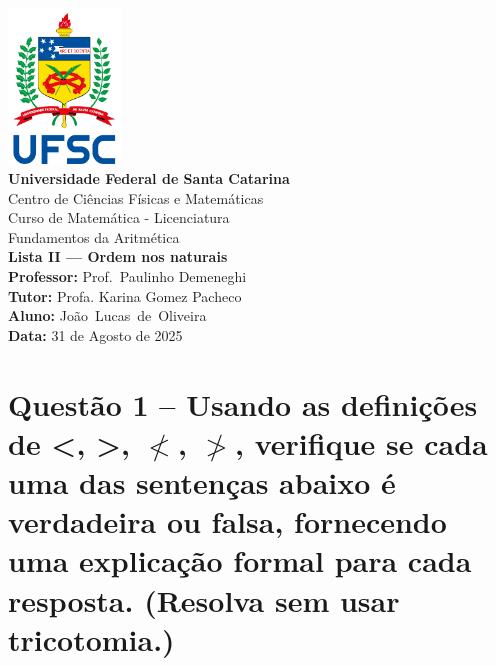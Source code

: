 \documentclass[12pt,a4paper]{article}
\newcommand{\universidade}{Universidade Federal de Santa Catarina}
\newcommand{\centro}{Centro de Ciências Físicas e Matemáticas}
\newcommand{\curso}{Curso de Matemática - Licenciatura}
\newcommand{\disciplina}{Fundamentos da Aritmética}
\newcommand{\professor}{Prof.\ Paulinho Demeneghi}
\newcommand{\tutora}{Profa. Karina Gomez Pacheco}
\newcommand{\autor}{João\ Lucas\ de\ Oliveira}
\newcommand{\dataentrega}{31 de Agosto de 2025}
\begin{document}
\begin{center}
    \includegraphics[width=3cm]{ufsc_logo}\\[0.3cm]
    \textbf{\universidade}\\
    \centro\\
    \curso\\[1cm]
    \disciplina\\
    \textbf{Lista II — Ordem nos naturais}\\[0.5cm]
    \textbf{Professor:} \professor\\
    \textbf{Tutor:} \tutora\\
    \textbf{Aluno:} \autor\\
    \textbf{Data:} \dataentrega\\
\end{center}

\vspace{1cm}

\section*{Questão 1 -- Usando as definições de <, >, $\not<$, $\not>$, verifique se cada uma das sentenças abaixo é verdadeira ou falsa, fornecendo uma explicação formal para cada resposta. (Resolva sem usar tricotomia.)}
\end{document}
